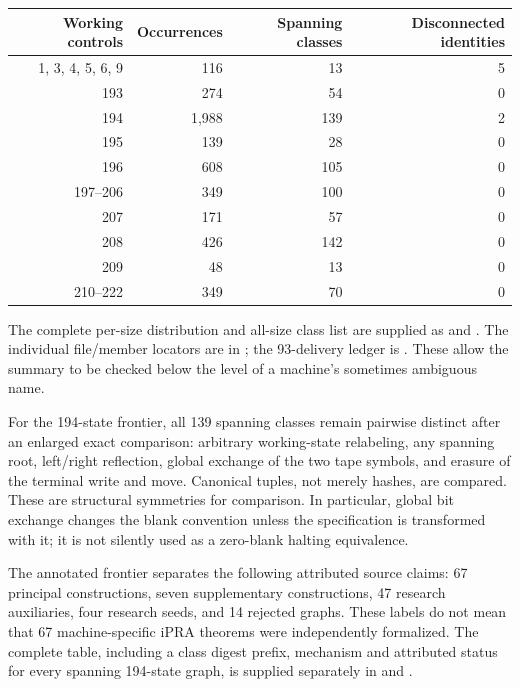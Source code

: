 \begin{center}
\begin{tabular}{@{}rrrr@{}}
\toprule
Working controls & Occurrences & Spanning classes & Disconnected identities\\
\midrule
1, 3, 4, 5, 6, 9 & 116 & 13 & 5\\
193 & 274 & 54 & 0\\
194 & 1,988 & 139 & 2\\
195 & 139 & 28 & 0\\
196 & 608 & 105 & 0\\
197--206 & 349 & 100 & 0\\
207 & 171 & 57 & 0\\
208 & 426 & 142 & 0\\
209 & 48 & 13 & 0\\
210--222 & 349 & 70 & 0\\
\bottomrule
\end{tabular}
\end{center}

The complete per-size distribution and all-size class list are supplied as
 and
. The individual file/member locators are
in ; the 93-delivery ledger is
. These allow the summary to be checked below the
level of a machine's sometimes ambiguous name.

For the 194-state frontier, all 139 spanning classes remain pairwise distinct
after an enlarged exact comparison: arbitrary working-state relabeling, any
spanning root, left/right reflection, global exchange of the two tape symbols,
and erasure of the terminal write and move. Canonical tuples, not merely
hashes, are compared. These are structural symmetries for comparison. In
particular, global bit exchange changes the blank convention unless the
specification is transformed with it; it is not silently used as a zero-blank
halting equivalence.

The annotated frontier separates the following attributed source claims:
67 principal constructions, seven supplementary constructions, 47 research
auxiliaries, four research seeds, and 14 rejected graphs. These labels do not
mean that 67 machine-specific iPRA theorems were independently formalized.
The complete table, including a class digest prefix, mechanism and attributed
status for every spanning 194-state graph, is supplied separately in
 and
.

